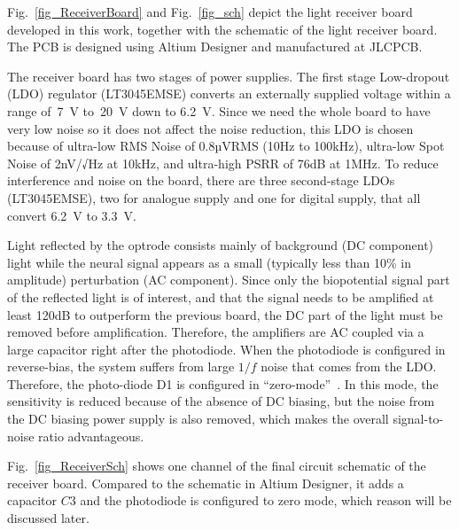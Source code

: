 Fig.~\ref{fig_ReceiverBoard} and Fig.~\ref{fig_sch} depict the light receiver board developed in this work, together with the schematic of the light receiver board.  The PCB is designed using Altium Designer and manufactured at JLCPCB.

The receiver board has two stages of power supplies.  The first stage Low-dropout (LDO) regulator (LT3045EMSE) converts an externally supplied voltage within a range of~\qty{7}{V} to~\qty{20}{V} down to \qty{6.2}{V}.  Since we need the whole board to have very low noise so it does not affect the noise reduction, this LDO is chosen because of ultra-low RMS Noise of 0.8µVRMS (10Hz to 100kHz), ultra-low Spot Noise of 2nV/√Hz at 10kHz, and ultra-high PSRR of 76dB at 1MHz.  To reduce interference and noise on the board, there are three second-stage LDOs (LT3045EMSE), two for analogue supply and one for digital supply, that all convert \qty{6.2}{V} to \qty{3.3}{V}.

Light reflected by the optrode consists mainly of background (DC component) light while the neural signal appears as a small (typically less than 10\% in amplitude) perturbation (AC component). Since only the biopotential signal part of the reflected light is of interest, and that the signal needs to be amplified at least 120dB to outperform the previous board, the DC part of the light must be removed before amplification.  Therefore, the amplifiers are AC coupled via a large capacitor right after the photodiode. When the photodiode is configured in reverse-bias, the system suffers from large $1/f$ noise that comes from the LDO. Therefore, the photo-diode D1 is configured in ``zero-mode''~\cite{zero-mode_detection}.  In this mode, the sensitivity is reduced because of the absence of DC biasing, but the noise from the DC biasing power supply is also removed, which makes the overall signal-to-noise ratio advantageous.

Fig.~\ref{fig_ReceiverSch} shows one channel of the final circuit schematic of the receiver board.  Compared to the schematic in Altium Designer, it adds a capacitor $C3$ and the photodiode is configured to zero mode, which reason will be discussed later.

